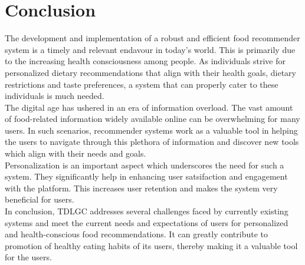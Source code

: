 \chapter{Conclusion} \label{chapter:Conclusion}

\indent The development and implementation of a robust and efficient food recommender system is a timely and relevant endavour in today's world. This is primarily due to the increasing health consciousness among people. As individuals strive for personalized dietary recommendations that align with their health goals, dietary restrictions and taste preferences, a system that can properly cater to these individuals is much needed.
\\
\indent The digital age has ushered in an era of information overload. The vast amount of food-related information widely available online can be overwhelming for many users. In such scenarios, recommender systems work as a valuable tool in helping the users to navigate through this plethora of information and discover new tools which align with their needs and goals.
\\
\indent Personalization is an important aspect which underscores the need for such a system. They significantly help in enhancing user satsifaction and engagement with the platform. This increases user retention and makes the system very beneficial for users.
\\
\indent In conclusion, TDLGC addresses several challenges faced by currently existing systems and meet the current needs and expectations of users for personalized and health-conscious food recommendations. It can greatly contribute to promotion of healthy eating habits of its users, thereby making it a valuable tool for the users.